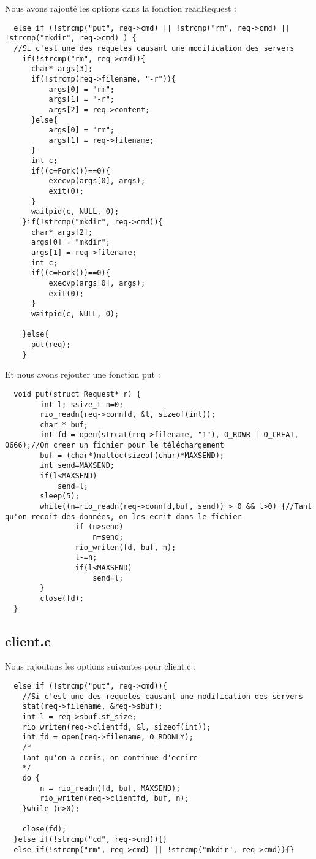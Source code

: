 \documentclass{report}
\begin{document}
  Nous avons rajout\'e les options dans la fonction readRequest :
  \begin{lstlisting}
  else if (!strcmp("put", req->cmd) || !strcmp("rm", req->cmd) || !strcmp("mkdir", req->cmd) ) {
  //Si c'est une des requetes causant une modification des servers
    if(!strcmp("rm", req->cmd)){
      char* args[3];
      if(!strcmp(req->filename, "-r")){
          args[0] = "rm";
          args[1] = "-r";
          args[2] = req->content;
      }else{
          args[0] = "rm";
          args[1] = req->filename;
      }
      int c;
      if((c=Fork())==0){
          execvp(args[0], args);
          exit(0);
      }
      waitpid(c, NULL, 0);
    }if(!strcmp("mkdir", req->cmd)){
      char* args[2];
      args[0] = "mkdir";
      args[1] = req->filename;
      int c;
      if((c=Fork())==0){
          execvp(args[0], args);
          exit(0);
      }
      waitpid(c, NULL, 0);

    }else{
      put(req);
    }
  \end{lstlisting}
  Et nous avons rejouter une fonction put :
  \begin{lstlisting}
  void put(struct Request* r) {
  		int l; ssize_t n=0;
  		rio_readn(req->connfd, &l, sizeof(int));
  		char * buf;
  		int fd = open(strcat(req->filename, "1"), O_RDWR | O_CREAT, 0666);//On creer un fichier pour le téléchargement
  		buf = (char*)malloc(sizeof(char)*MAXSEND);
  		int send=MAXSEND;
  		if(l<MAXSEND)
  			send=l;
  		sleep(5);
  		while((n=rio_readn(req->connfd,buf, send)) > 0 && l>0) {//Tant qu'on recoit des données, on les ecrit dans le fichier
  				if (n>send)
  					n=send;
  				rio_writen(fd, buf, n);
  				l-=n;
  				if(l<MAXSEND)
  					send=l;
  		}
  		close(fd);
  }
  \end{lstlisting}

  \subsection{client.c}

  Nous rajoutons les options suivantes pour client.c :

  \begin{lstlisting}
  else if (!strcmp("put", req->cmd)){
    //Si c'est une des requetes causant une modification des servers
    stat(req->filename, &req->sbuf);
    int l = req->sbuf.st_size;
    rio_writen(req->clientfd, &l, sizeof(int));
    int fd = open(req->filename, O_RDONLY);
    /*
    Tant qu'on a ecris, on continue d'ecrire
    */
    do {
        n = rio_readn(fd, buf, MAXSEND);
        rio_writen(req->clientfd, buf, n);
    }while (n>0);

    close(fd);
  }else if(!strcmp("cd", req->cmd)){}
  else if(!strcmp("rm", req->cmd) || !strcmp("mkdir", req->cmd)){}
  \end{lstlisting}
\end{document}
